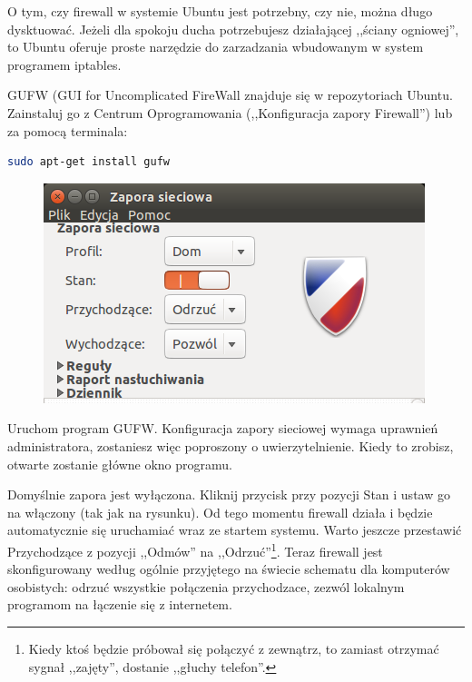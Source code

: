 O tym, czy firewall w systemie Ubuntu jest potrzebny, czy nie, można długo dysktuować. Jeżeli dla spokoju ducha potrzebujesz działającej ,,ściany ogniowej'', to Ubuntu oferuje proste narzędzie do zarzadzania wbudowanym w system programem iptables.

GUFW (\textcolor{ubuntu_orange}{GUI for Uncomplicated FireWall} znajduje się w repozytoriach Ubuntu. Zainstaluj go z Centrum Oprogramowania (,,Konfiguracja zapory Firewall'') lub za pomocą terminala:
\begin{lstlisting}[language=bash]
sudo apt-get install gufw
\end{lstlisting}

\begin{figure}
	\vspace{-10pt}
	\includegraphics[width=\linewidth]{images/programy_gufw.png}
\end{figure}

Uruchom program GUFW. Konfiguracja zapory sieciowej wymaga uprawnień administratora, zostaniesz więc poproszony o uwierzytelnienie. Kiedy to zrobisz, otwarte zostanie główne okno programu.

Domyślnie zapora jest wyłączona. Kliknij przycisk przy pozycji \textcolor{ubuntu_orange}{Stan} i ustaw go na włączony (tak jak na rysunku). Od tego momentu firewall działa i będzie automatycznie się uruchamiać wraz ze startem systemu. Warto jeszcze przestawić \textcolor{ubuntu_orange}{Przychodzące} z pozycji ,,Odmów'' na ,,Odrzuć''\footnote{Kiedy ktoś będzie próbował się połączyć z zewnątrz, to zamiast otrzymać sygnał ,,zajęty'', dostanie ,,głuchy telefon''.}. Teraz firewall jest skonfigurowany według ogólnie przyjętego na świecie schematu dla komputerów osobistych: odrzuć wszystkie połączenia przychodzace, zezwól lokalnym programom na łączenie się z internetem.

